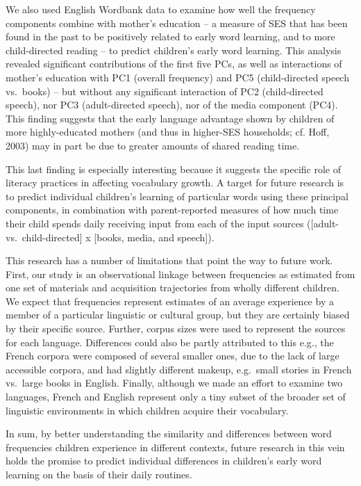 \documentclass[10pt, letterpaper]{article}
\begin{document}
We also used English Wordbank data to examine how well the frequency
components combine with mother's education -- a measure of SES that has
been found in the past to be positively related to early word learning,
and to more child-directed reading -- to predict children's early word
learning. This analysis revealed significant contributions of the first
five PCs, as well as interactions of mother's education with PC1
(overall frequency) and PC5 (child-directed speech vs.~books) -- but
without any significant interaction of PC2 (child-directed speech), nor
PC3 (adult-directed speech), nor of the media component (PC4). This
finding suggests that the early language advantage shown by children of
more highly-educated mothers (and thus in higher-SES households; cf.
Hoff, 2003) may in part be due to greater amounts of shared reading
time.

This last finding is especially interesting because it suggests the
specific role of literacy practices in affecting vocabulary growth. A
target for future research is to predict individual children's learning
of particular words using these principal components, in combination
with parent-reported measures of how much time their child spends daily
receiving input from each of the input sources ({[}adult-
vs.~child-directed{]} x {[}books, media, and speech{]}).

This research has a number of limitations that point the way to future
work. First, our study is an observational linkage between frequencies
as estimated from one set of materials and acquisition trajectories from
wholly different children. We expect that frequencies represent
estimates of an average experience by a member of a particular
linguistic or cultural group, but they are certainly biased by their
specific source. Further, corpus sizes were used to represent the
sources for each language. Differences could also be partly attributed
to this e.g., the French corpora were composed of several smaller ones,
due to the lack of large accessible corpora, and had slightly different
makeup, e.g.~small stories in French vs.~large books in English.
Finally, although we made an effort to examine two languages, French and
English represent only a tiny subset of the broader set of linguistic
environments in which children acquire their vocabulary.

In sum, by better understanding the similarity and differences between
word frequencies children experience in different contexts, future
research in this vein holds the promise to predict individual
differences in children's early word learning on the basis of their
daily routines.
\end{document}
